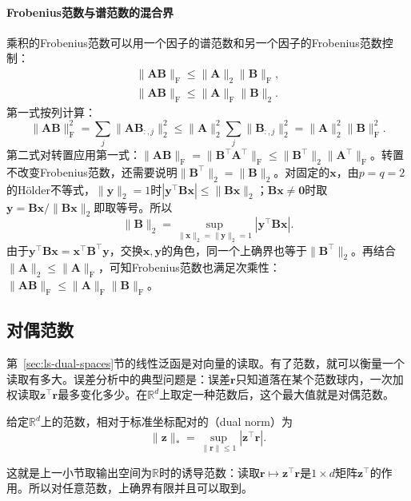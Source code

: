 \paragraph{Frobenius范数与谱范数的混合界}
乘积的Frobenius范数可以用一个因子的谱范数和另一个因子的Frobenius范数控制：
\begin{equation}
\begin{gathered}
\lVert\bm A\bm B\rVert_{\mathrm F}
 \leq\lVert\bm A\rVert_2\lVert\bm B\rVert_{\mathrm F},\\
\lVert\bm A\bm B\rVert_{\mathrm F}
 \leq\lVert\bm A\rVert_{\mathrm F}\lVert\bm B\rVert_2.
\end{gathered}
\label{eq:matrix-analysis-mixed-submultiplicativity}
\end{equation}
第一式按列计算：
\[
 \lVert\bm A\bm B\rVert_{\mathrm F}^2=\sum_j\lVert\bm A\bm B_{:,j}\rVert_2^2\leq\lVert\bm A\rVert_2^2\sum_j\lVert\bm B_{:,j}\rVert_2^2=\lVert\bm A\rVert_2^2\lVert\bm B\rVert_{\mathrm F}^2.
\]
第二式对转置应用第一式：$\lVert\bm A\bm B\rVert_{\mathrm F}=\lVert\bm B^\top\bm A^\top\rVert_{\mathrm F}\leq\lVert\bm B^\top\rVert_2\lVert\bm A^\top\rVert_{\mathrm F}$。转置不改变Frobenius范数，还需要说明$\lVert\bm B^\top\rVert_2=\lVert\bm B\rVert_2$。对固定的$\bm x$，由$p=q=2$的Hölder不等式，$\lVert\bm y\rVert_2=1$时$|\bm y^\top\bm B\bm x|\leq\lVert\bm B\bm x\rVert_2$；$\bm B\bm x\neq\bm0$时取$\bm y=\bm B\bm x/\lVert\bm B\bm x\rVert_2$即取等号。所以
\[
 \lVert\bm B\rVert_2=\sup_{\lVert\bm x\rVert_2=\lVert\bm y\rVert_2=1}|\bm y^\top\bm B\bm x|.
\]
由于$\bm y^\top\bm B\bm x=\bm x^\top\bm B^\top\bm y$，交换$\bm x,\bm y$的角色，同一个上确界也等于$\lVert\bm B^\top\rVert_2$。再结合$\lVert\bm A\rVert_2\leq\lVert\bm A\rVert_{\mathrm F}$，可知Frobenius范数也满足次乘性：$\lVert\bm A\bm B\rVert_{\mathrm F}\leq\lVert\bm A\rVert_{\mathrm F}\lVert\bm B\rVert_{\mathrm F}$。

\subsection{对偶范数}
\label{sec:ls-dual-norms}

第~\ref{sec:ls-dual-spaces}节的线性泛函是对向量的读取。有了范数，就可以衡量一个读取有多大。误差分析中的典型问题是：误差$\bm r$只知道落在某个范数球内，一次加权读取$\bm z^\top\bm r$最多变化多少。在$\mathbb R^d$上取定一种范数后，这个最大值就是对偶范数。
\begin{definition}[对偶范数]
\label{def:linear-algebra-dual-norm}
给定$\mathbb R^d$上的范数，相对于标准坐标配对的（dual norm）为
\begin{equation}
 \lVert\bm z\rVert_*=\sup_{\lVert\bm r\rVert\leq1}|\bm z^\top\bm r|.
 \label{eq:linear-algebra-dual-norm-definition}
\end{equation}
\end{definition}
这就是上一小节取输出空间为$\mathbb R$时的诱导范数：读取$\bm r\mapsto\bm z^\top\bm r$是$1\times d$矩阵$\bm z^\top$的作用。所以对任意范数，上确界有限并且可以取到。

